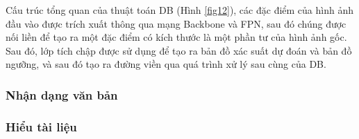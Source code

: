 Cấu trúc tổng quan của thuật toán DB (Hình \ref{fig12}), các đặc điểm của hình ảnh đầu vào được trích xuất thông qua mạng Backbone và FPN, sau đó chúng được nối liền để tạo ra một đặc điểm có kích thước là một phần tư của hình ảnh gốc. Sau đó, lớp tích chập được sử dụng để tạo ra bản đồ xác suất dự đoán và bản đồ ngưỡng, và sau đó tạo ra đường viền qua quá trình xử lý sau cùng của DB.

\subsubsection{Nhận dạng văn bản}
\subsubsection{Hiểu tài liệu}

